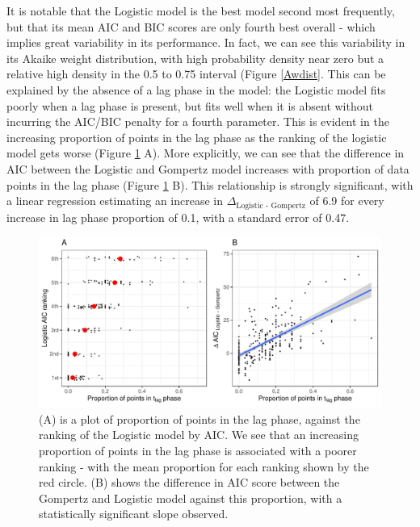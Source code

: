 \documentclass[11pt, a4paper]{article}
\begin{document}
\begin{linenumbers}
        It is notable that the Logistic model is the best model second most frequently, but that its mean AIC and BIC scores are only fourth best overall - which implies great variability in its performance. In fact, we can see this variability in its Akaike weight distribution, with high probability density near zero but a relative high density in the 0.5 to 0.75 interval (Figure \ref{Awdist}.  This can be explained by the absence of a lag phase in the model: the Logistic model fits poorly when a lag phase is present, but fits well when it is absent without incurring the AIC/BIC penalty for a fourth parameter. This is evident in the increasing proportion of points in the lag phase as the ranking of the logistic model gets worse (Figure \ref{fig:logistic_tlag} A). More explicitly, we can see that the difference in AIC between the Logistic and Gompertz model increases with proportion of data points in the lag phase (Figure \ref{fig:logistic_tlag} B). This relationship is strongly significant, with a linear regression estimating an increase in $\Delta_{\text{Logistic - Gompertz}}$ of 6.9 for every increase in lag phase proportion of 0.1, with a standard error of 0.47.
        
                \begin{figure}[H]
        \includegraphics[width=\linewidth]{../results/tlag_vs_logistic.pdf}
        \caption{(A) is a plot of proportion of points in the lag phase, against the ranking of the Logistic model by AIC. We see that an increasing proportion of points in the lag phase is associated with a poorer ranking - with the mean proportion for each ranking shown by the red circle. (B) shows the difference in AIC score between the Gompertz and Logistic model against this proportion, with a statistically significant slope observed.}
        \label{fig:logistic_tlag}
        \end{figure}        
        

\end{linenumbers}
\end{document}
